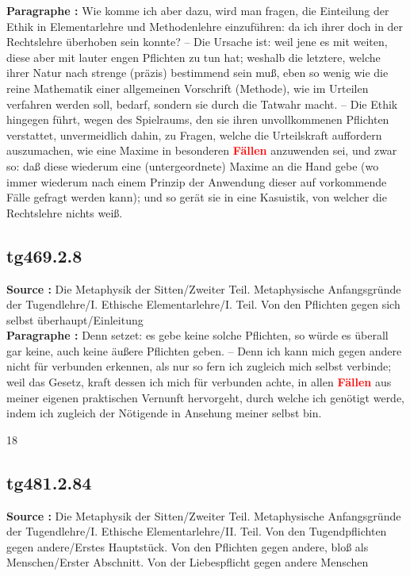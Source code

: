 \documentclass[a4paper,12pt,twoside]{book}
\newcommand{\match}[1]{\textcolor{red}{\textbf{#1}}}
\begin{document}
	\textbf{Paragraphe : }Wie komme ich aber dazu, wird man fragen, die Einteilung der Ethik in Elementarlehre und Methodenlehre einzuführen: da ich ihrer doch in der Rechtslehre überhoben sein konnte? – Die Ursache ist: weil jene es mit weiten, diese aber mit lauter engen Pflichten zu tun hat; weshalb die letztere, welche ihrer Natur nach strenge (präzis) bestimmend sein muß, eben so wenig wie die reine Mathematik einer allgemeinen Vorschrift (Methode), wie im Urteilen verfahren werden soll, bedarf, sondern sie durch die Tatwahr macht. – Die Ethik hingegen führt, wegen des Spielraums, den sie ihren unvollkommenen Pflichten verstattet, unvermeidlich dahin, zu Fragen, welche die Urteilskraft auffordern auszumachen, wie eine Maxime in besonderen \match{Fällen} anzuwenden sei, und zwar so: daß diese wiederum eine (untergeordnete) Maxime an die Hand gebe (wo immer wiederum nach einem Prinzip der Anwendung dieser auf vorkommende Fälle gefragt werden kann); und so gerät sie in eine Kasuistik, von welcher die Rechtslehre nichts weiß. 
	
	\subsection*{tg469.2.8} 
	\textbf{Source : }Die Metaphysik der Sitten/Zweiter Teil. Metaphysische Anfangsgründe der Tugendlehre/I. Ethische Elementarlehre/I. Teil. Von den Pflichten gegen sich selbst überhaupt/Einleitung\\  
	
	\textbf{Paragraphe : }Denn setzet: es gebe keine solche Pflichten, so würde es überall gar keine, auch keine äußere Pflichten geben. – Denn ich kann mich gegen andere nicht für verbunden erkennen, als nur so fern ich zugleich mich selbst verbinde; weil das Gesetz, kraft dessen ich mich für verbunden achte, in allen  \match{Fällen} aus meiner eigenen praktischen Vernunft hervorgeht, durch welche ich genötigt werde, indem ich zugleich der Nötigende in Ansehung meiner selbst bin.
	
	
	18
	
	
	
	\subsection*{tg481.2.84} 
	\textbf{Source : }Die Metaphysik der Sitten/Zweiter Teil. Metaphysische Anfangsgründe der Tugendlehre/I. Ethische Elementarlehre/II. Teil. Von den Tugendpflichten gegen andere/Erstes Hauptstück. Von den Pflichten gegen andere, bloß als Menschen/Erster Abschnitt. Von der Liebespflicht gegen andere Menschen\\  
	
\end{document}
